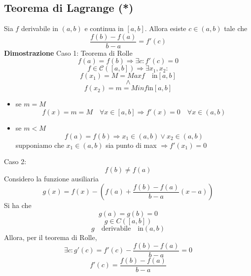 \documentclass[12pt]{article}
\begin{document}
\subsection{Teorema di Lagrange (*)}
Sia $f$ derivabile in $(a,b)$ e continua in $[a,b]$.
Allora esiste $c \in (a,b)$ tale che
\[ \frac{f(b)-f(a)}{b-a} = f'(c) \]
\textbf{Dimostrazione}\newline
Caso 1: Teorema di Rolle
\[ f(a) = f(b) \Rightarrow \exists c: f'(c) = 0 \]
\[f \in \mathscr{C}([a,b]) \Rightarrow \exists x_1, x_2 :\] 
\[f(x_1) = M = Maxf \quad \text{in} [a,b] \]
\[\wedge\]
\[f(x_2) = m = Minf \text{in} [a,b] \]
\begin{itemize}
  \item se $m=M$
  \[ f(x) = m = M \quad \forall x \in [a,b] \Rightarrow f'(x) = 0 \quad \forall x \in (a,b) \]
  \item se $m<M$ 
  \[f(a) = f(b) \Rightarrow x_1 \in (a,b) \vee x_2 \in (a,b)\]
  supponiamo che $x_1 \in (a,b)$ sia punto di max $\Rightarrow f'(x_1)=0$
\end{itemize}
Caso 2: \[f(b) \neq f(a)\]Considero la funzione ausiliaria 
\[g(x) = f(x) -(f(a) + \frac{f(b) - f(a)}{b-a}(x-a))\]
Si ha che 
\[g(a) = g(b) = 0\] 
\[g \in C([a,b])\] 
\[g \quad \text{derivabile} \quad \text{in} (a,b)\]
Allora, per il teorema di Rolle, 
\[ \exists c: g'(c) = f'(c) - \frac{f(b)-f(a)}{b-a} = 0\]
\[f'(c) = \frac{f(b) - f(a)}{b-a}\]
\end{document}
